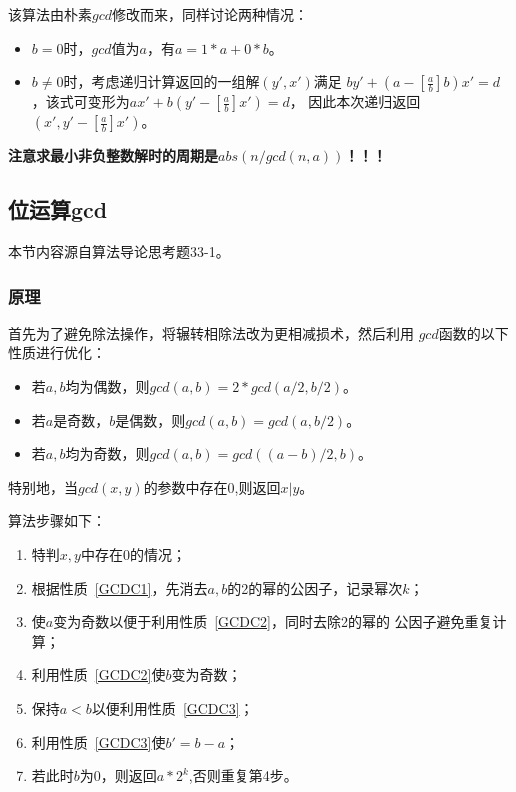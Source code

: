 该算法由朴素$gcd$修改而来，同样讨论两种情况：

\begin{itemize}
	\item $b=0$时，$gcd$值为$a$，有$a=1*a+0*b$。
	\item $b\neq 0$时，考虑递归计算返回的一组解$(y',x')$满足
	      $by'+(a-[\frac{a}{b}]b)x'=d$，该式可变形为$ax'+b(y'-[\frac{a}{b}]x')=d$，
	      因此本次递归返回$(x',y'-[\frac{a}{b}]x')$。
\end{itemize}

{\bfseries 注意求最小非负整数解时的周期是$abs(n/gcd(n,a))$！！！}

\subsection{位运算gcd}

本节内容源自算法导论\cite{ITA3}思考题33-1。

\subsubsection{原理}

首先为了避免除法操作，将辗转相除法改为更相减损术，然后利用
$gcd$函数的以下性质进行优化：

\begin{itemize}
	\item \begin{property}\label{GCDC1}
		      若$a,b$均为偶数，则$gcd(a,b)=2*gcd(a/2,b/2)$。
	      \end{property}
	\item \begin{property}\label{GCDC2}
		      若$a$是奇数，$b$是偶数，则$gcd(a,b)=gcd(a,b/2)$。
	      \end{property}
	\item \begin{property}\label{GCDC3}
		      若$a,b$均为奇数，则$gcd(a,b)=gcd((a-b)/2,b)$。
	      \end{property}
\end{itemize}

特别地，当$gcd(x,y)$的参数中存在0,则返回$x|y$。

算法步骤如下：
\begin{enumerate}
	\item 特判$x,y$中存在0的情况；
	\item 根据性质~\ref{GCDC1}，先消去$a,b$的2的幂的公因子，记录幂次$k$；
	\item 使$a$变为奇数以便于利用性质~\ref{GCDC2}，同时去除2的幂的
	      公因子避免重复计算；
	\item 利用性质~\ref{GCDC2}使$b$变为奇数；
	\item 保持$a<b$以便利用性质~\ref{GCDC3}；
	\item 利用性质~\ref{GCDC3}使$b'=b-a$；
	\item 若此时$b$为0，则返回$a*2^k$,否则重复第4步。
\end{enumerate}

